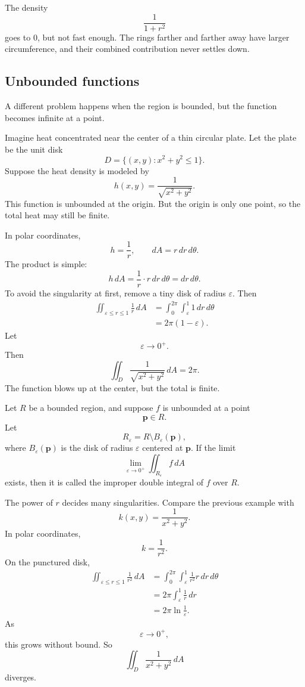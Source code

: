 The density
\[
    \frac{1}{1+r^2}
\]
goes to \(0\), but not fast enough.  The rings farther and farther away have larger
circumference, and their combined contribution never settles down.

\subsection{Unbounded functions}

A different problem happens when the region is bounded, but the function becomes
infinite at a point.

Imagine heat concentrated near the center of a thin circular plate.  Let the plate be
the unit disk
\[
    D=\{(x,y):x^2+y^2\le1\}.
\]
Suppose the heat density is modeled by
\[
    h(x,y)=\frac{1}{\sqrt{x^2+y^2}}.
\]
This function is unbounded at the origin.  But the origin is only one point, so the
total heat may still be finite.

In polar coordinates,
\[
    h=\frac1r,
    \qquad
    dA=r\,dr\,d\theta.
\]
The product is simple:
\[
    h\,dA=\frac1r\cdot r\,dr\,d\theta=dr\,d\theta.
\]
To avoid the singularity at first, remove a tiny disk of radius \(\varepsilon\).  Then
\[
\begin{aligned}
\iint_{\varepsilon\le r\le1}\frac1r\,dA
&=
\int_0^{2\pi}\int_\varepsilon^1 1\,dr\,d\theta\\
&=
2\pi(1-\varepsilon).
\end{aligned}
\]
Let
\[
    \varepsilon\to0^+.
\]
Then
\[
\boxed{
    \iint_D\frac{1}{\sqrt{x^2+y^2}}\,dA=2\pi.
}
\]
The function blows up at the center, but the total is finite.

\begin{definition}
Let \(R\) be a bounded region, and suppose \(f\) is unbounded at a point
\[
    \mathbf p\in R.
\]
Let
\[
    R_\varepsilon=R\setminus B_\varepsilon(\mathbf p),
\]
where \(B_\varepsilon(\mathbf p)\) is the disk of radius \(\varepsilon\) centered at
\(\mathbf p\).  If the limit
\[
\boxed{
    \lim_{\varepsilon\to0^+}\iint_{R_\varepsilon} f\,dA
}
\]
exists, then it is called the improper double integral of \(f\) over \(R\).
\end{definition}

The power of \(r\) decides many singularities.  Compare the previous example with
\[
    k(x,y)=\frac{1}{x^2+y^2}.
\]
In polar coordinates,
\[
    k=\frac1{r^2}.
\]
On the punctured disk,
\[
\begin{aligned}
\iint_{\varepsilon\le r\le1}\frac1{r^2}\,dA
&=
\int_0^{2\pi}\int_\varepsilon^1 \frac1{r^2}r\,dr\,d\theta\\
&=
2\pi\int_\varepsilon^1\frac1r\,dr\\
&=
2\pi\ln\frac1{\varepsilon}.
\end{aligned}
\]
As
\[
    \varepsilon\to0^+,
\]
this grows without bound.  So
\[
\boxed{
    \iint_D\frac{1}{x^2+y^2}\,dA
}
\]
diverges.

